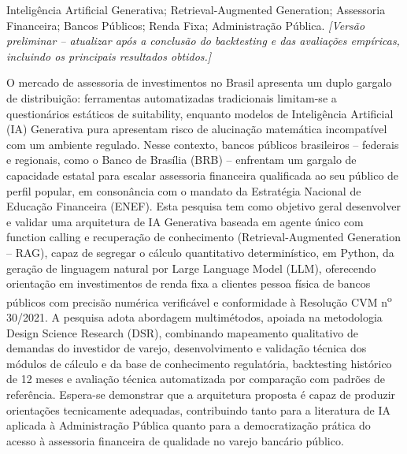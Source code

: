 \documentclass[dissertacao]{idpthesis}
\begin{document}
\capa
\folioderosto
\fichacatalografica
\folhadeaprovacao

\begin{dedicatoria}
\end{dedicatoria}

\begin{agradecimentos}
\end{agradecimentos}

\begin{resumo}{Intelig\^encia Artificial Generativa; Retrieval-Augmented Generation; Assessoria Financeira; Bancos P\'ublicos; Renda Fixa; Administra\c{c}\~ao P\'ublica.}
  \textit{[Vers\~ao preliminar -- atualizar ap\'os a conclus\~ao do
  backtesting e das avalia\c{c}\~oes emp\'iricas, incluindo os principais
  resultados obtidos.]}\par\vspace{0.5\baselineskip}

  O mercado de assessoria de investimentos no Brasil apresenta um duplo
  gargalo de distribui\c{c}\~ao: ferramentas automatizadas tradicionais
  limitam-se a question\'arios est\'aticos de suitability, enquanto modelos
  de Intelig\^encia Artificial (IA) Generativa pura apresentam risco de
  alucina\c{c}\~ao matem\'atica incompat\'ivel com um ambiente regulado.
  Nesse contexto, bancos p\'ublicos brasileiros -- federais e regionais,
  como o Banco de Bras\'ilia (BRB) -- enfrentam um gargalo de capacidade
  estatal para escalar assessoria
  financeira qualificada ao seu p\'ublico de perfil popular, em conson\^ancia
  com o mandato da Estrat\'egia Nacional de Educa\c{c}\~ao Financeira (ENEF).
  Esta pesquisa tem como objetivo geral desenvolver e validar uma
  arquitetura de IA Generativa baseada em agente \'unico com function
  calling e recupera\c{c}\~ao de conhecimento (Retrieval-Augmented
  Generation -- RAG), capaz de segregar o c\'alculo quantitativo
  determin\'istico, em Python, da gera\c{c}\~ao de linguagem natural por
  Large Language Model (LLM), oferecendo orienta\c{c}\~ao em investimentos
  de renda fixa a clientes pessoa f\'isica de bancos p\'ublicos com precis\~ao num\'erica
  verific\'avel e conformidade \`a Resolu\c{c}\~ao CVM n\textsuperscript{o}
  30/2021. A pesquisa adota abordagem multim\'etodos, apoiada na
  metodologia Design Science Research (DSR), combinando mapeamento
  qualitativo de demandas do investidor de varejo, desenvolvimento e
  valida\c{c}\~ao t\'ecnica dos m\'odulos de c\'alculo e da base de
  conhecimento regulat\'oria, backtesting hist\'orico de 12 meses e
  avalia\c{c}\~ao t\'ecnica automatizada por compara\c{c}\~ao com padr\~oes
  de refer\^encia. Espera-se demonstrar que a arquitetura proposta \'e capaz
  de produzir orienta\c{c}\~oes tecnicamente adequadas, contribuindo tanto
  para a literatura de IA aplicada \`a Administra\c{c}\~ao P\'ublica quanto
  para a democratiza\c{c}\~ao pr\'atica do acesso \`a assessoria financeira
  de qualidade no varejo banc\'ario p\'ublico.
\end{resumo}
\end{document}
